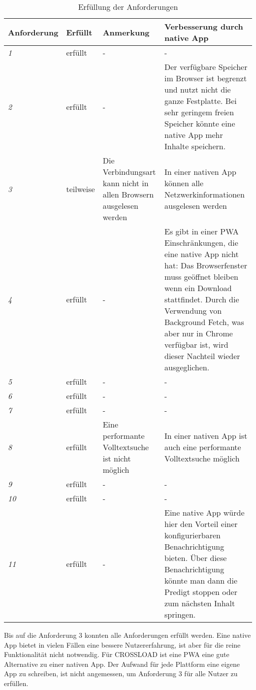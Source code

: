 \begin{sidewaystable}[h]
  \renewcommand{\arraystretch}{1.2}
  \centering
  \sffamily
  \begin{footnotesize}
    \begin{tabularx}{1.0\textwidth}{l l X X}
      \toprule
      \textbf{Anforderung} & \textbf{Erfüllt} & \textbf{Anmerkung} & \textbf{Verbesserung durch native App} \\
      \midrule
      \emph{1} & erfüllt & - & - \\
      \emph{2} & erfüllt & - & Der verfügbare Speicher im Browser ist begrenzt und nutzt nicht die ganze Festplatte. Bei sehr geringem freien Speicher könnte eine native App mehr Inhalte speichern. \\
      \emph{3} & teilweise & Die Verbindungsart kann nicht in allen Browsern ausgelesen werden & In einer nativen App können alle Netzwerkinformationen ausgelesen werden \\
      \emph{4} & erfüllt & - & Es gibt in einer \ac{PWA} Einschränkungen, die eine native App nicht hat: Das Browserfenster muss geöffnet bleiben wenn ein Download stattfindet. Durch die Verwendung von Background Fetch, was aber nur in Chrome verfügbar ist, wird dieser Nachteil wieder ausgeglichen. \\
      \emph{5} & erfüllt & - & - \\
      \emph{6} & erfüllt & - & - \\
      \emph{7} & erfüllt & - & - \\
      \emph{8} & erfüllt & Eine performante Volltextsuche ist nicht möglich & In einer nativen App ist auch eine performante Volltextsuche möglich \\
      \emph{9} & erfüllt & - & - \\
      \emph{10} & erfüllt & - & - \\
      \emph{11} & erfüllt & - & Eine native App würde hier den Vorteil einer konfigurierbaren Benachrichtigung bieten. Über diese Benachrichtigung könnte man dann die Predigt stoppen oder zum nächsten Inhalt springen. \\
      \bottomrule
    \end{tabularx}
  \end{footnotesize}
  \rmfamily
  \caption{Erfüllung der Anforderungen}
  \label{Anforderungen-Tabelle}
\end{sidewaystable}

\clearpage

Bis auf die Anforderung 3 konnten alle Anforderungen erfüllt werden. Eine native App bietet in vielen Fällen eine bessere Nutzererfahrung, ist aber für die reine Funktionalität nicht notwendig. Für CROSSLOAD ist eine \ac{PWA} eine gute Alternative zu einer nativen App. Der Aufwand für jede Plattform eine eigene App zu schreiben, ist nicht angemessen, um Anforderung 3 für alle Nutzer zu erfüllen. 

